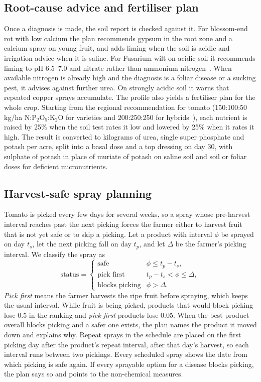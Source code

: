 \documentclass[conference]{IEEEtran}
\begin{document}
\subsection{Root-cause advice and fertiliser plan}
Once a diagnosis is made, the soil report is checked against it. For blossom-end rot with low calcium the plan recommends gypsum in the root zone and a calcium spray on young fruit, and adds liming when the soil is acidic and irrigation advice when it is saline. For Fusarium wilt on acidic soil it recommends liming to pH 6.5--7.0 and nitrate rather than ammonium nitrogen~\cite{jones1981}. When available nitrogen is already high and the diagnosis is a foliar disease or a sucking pest, it advises against further urea. On strongly acidic soil it warns that repeated copper sprays accumulate. The profile also yields a fertiliser plan for the whole crop. Starting from the regional recommendation for tomato (150:100:50\,kg/ha N:P$_2$O$_5$:K$_2$O for varieties and 200:250:250 for hybrids~\cite{tnau_tomato}), each nutrient is raised by 25\% when the soil test rates it low and lowered by 25\% when it rates it high. The result is converted to kilograms of urea, single super phosphate and potash per acre, split into a basal dose and a top dressing on day 30, with sulphate of potash in place of muriate of potash on saline soil and soil or foliar doses for deficient micronutrients.

\subsection{Harvest-safe spray planning}
Tomato is picked every few days for several weeks, so a spray whose pre-harvest interval reaches past the next picking forces the farmer either to harvest fruit that is not yet safe or to skip a picking. Let a product with interval $\phi$ be sprayed on day $t_s$, let the next picking fall on day $t_p$, and let $\Delta$ be the farmer's picking interval. We classify the spray as
\begin{equation}
  \mathrm{status} = \begin{cases} \text{safe} & \phi \le t_p - t_s,\\ \text{pick first} & t_p - t_s < \phi \le \Delta,\\ \text{blocks picking} & \phi > \Delta. \end{cases}
  \label{eq:phi}
\end{equation}
\emph{Pick first} means the farmer harvests the ripe fruit before spraying, which keeps the usual interval. While fruit is being picked, products that would block picking lose 0.5 in the ranking and \emph{pick first} products lose 0.05. When the best product overall blocks picking and a safer one exists, the plan names the product it moved down and explains why. Repeat sprays in the schedule are placed on the first picking day after the product's repeat interval, after that day's harvest, so each interval runs between two pickings. Every scheduled spray shows the date from which picking is safe again. If every sprayable option for a disease blocks picking, the plan says so and points to the non-chemical measures.
\end{document}
